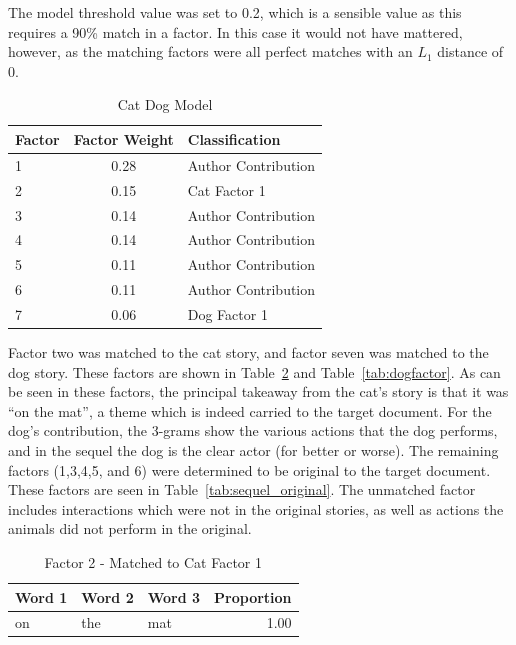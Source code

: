 \documentclass[../ut-dissertation.tex]{subfiles}
\begin{document}
The model threshold value was set to 0.2, which is a sensible value as
this requires a 90\% match in a factor.  In this case it would not
have mattered, however, as the matching factors were all perfect
matches with an $L_1$ distance of 0.

\begin{table}[p]
  \centering
  \caption{Cat Dog Model} \label{tab:cat_dog_class}
  \begin{tabular}{|l|c|l|}
    \hline
    Factor & Factor Weight & Classification\\
    \hline
    1 & 0.28 & Author Contribution\\
    2 & 0.15 & Cat Factor 1\\
    3 & 0.14 & Author Contribution\\
    4 & 0.14 & Author Contribution\\
    5 & 0.11 & Author Contribution\\
    6 & 0.11 & Author Contribution\\
    7 & 0.06 & Dog Factor 1\\
    \hline
  \end{tabular}
\end{table}


Factor two was matched to the cat story, and factor seven was matched
to the dog story.  These factors are shown in
Table~\ref{tab:catfactor} and Table~\ref{tab:dogfactor}.  As can be
seen in these factors, the principal takeaway from the cat's story is
that it was ``on the mat'', a theme which is indeed carried to the
target document.  For the dog's contribution, the 3-grams show the
various actions that the dog performs, and in the sequel the dog is
the clear actor (for better or worse). The remaining factors (1,3,4,5,
and 6) were determined to be original to the target document.  These
factors are seen in Table~\ref{tab:sequel_original}.  The unmatched
factor includes interactions which were not in the original stories,
as well as actions the animals did not perform in the original.

\begin{table}[p]
  \centering
  \caption{Factor 2 - Matched to Cat Factor 1}\label{tab:catfactor}
  \begin{tabular}{|lll|r|}
    \hline
    Word 1 & Word 2 & Word 3 & Proportion\\
    \hline
    on & the & mat & 1.00\\
    \hline
  \end{tabular}
\end{table}
\end{document}

